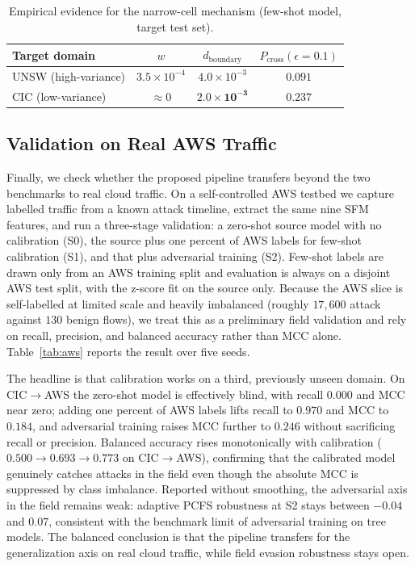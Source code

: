 \documentclass[11pt,a4paper]{article}
\begin{document}
\begin{table}[htbp]
\centering
\caption{Empirical evidence for the narrow-cell mechanism (few-shot model, target test set).}
\label{tab:cell}
\footnotesize
\begin{tabular}{lccc}
\toprule
Target domain & $w$ & $d_{\text{boundary}}$ & $P_{\text{cross}}(\epsilon{=}0.1)$ \\
\midrule
UNSW (high-variance) & $3.5\times10^{-4}$ & $4.0\times10^{-3}$ & $0.091$ \\
CIC (low-variance)   & $\approx 0$ & $\mathbf{2.0\times10^{-3}}$ & $\mathbf{0.237}$ \\
\bottomrule
\end{tabular}
\end{table}

\subsection{Validation on Real AWS Traffic}
\label{sec:aws}
Finally, we check whether the proposed pipeline transfers beyond the two benchmarks
to real cloud traffic. On a self-controlled AWS testbed we capture labelled traffic
from a known attack timeline, extract the same nine SFM features, and run a
three-stage validation: a zero-shot source model with no calibration (S0), the source
plus one percent of AWS labels for few-shot calibration (S1), and that plus
adversarial training (S2). Few-shot labels are drawn only from an AWS training split
and evaluation is always on a disjoint AWS test split, with the z-score fit on the
source only. Because the AWS slice is self-labelled at limited scale and heavily
imbalanced (roughly $17{,}600$ attack against $130$ benign flows), we treat this as a
preliminary field validation and rely on recall, precision, and balanced accuracy
rather than MCC alone. Table~\ref{tab:aws} reports the result over five seeds.

The headline is that calibration works on a third, previously unseen domain. On
CIC$\rightarrow$AWS the zero-shot model is effectively blind, with recall $0.000$ and
MCC near zero; adding one percent of AWS labels lifts recall to $0.970$ and MCC to
$0.184$, and adversarial training raises MCC further to $0.246$ without sacrificing
recall or precision. Balanced accuracy rises monotonically with calibration
($0.500\rightarrow0.693\rightarrow0.773$ on CIC$\rightarrow$AWS), confirming that the
calibrated model genuinely catches attacks in the field even though the absolute MCC
is suppressed by class imbalance. Reported without smoothing, the adversarial axis in
the field remains weak: adaptive PCFS robustness at S2 stays between $-0.04$ and
$0.07$, consistent with the benchmark limit of adversarial training on tree models.
The balanced conclusion is that the pipeline transfers for the generalization axis on
real cloud traffic, while field evasion robustness stays open.
\end{document}
